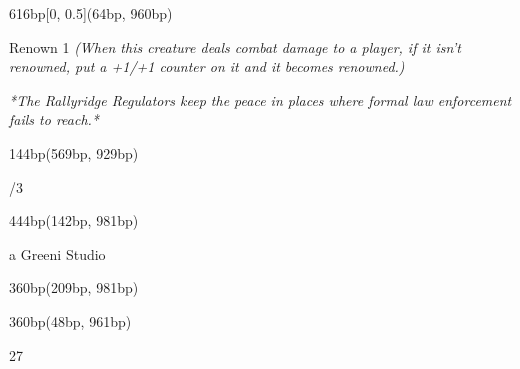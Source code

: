 \documentclass{article}
\begin{document}
  \begin{textblock*}{616bp}[0, 0.5](64bp, 960bp)

  \fontsize{\count255 pt}{\count255 pt}
  \plantin
  \selectfont
	\begin{flushleft}\relax Renown 1 \emph{(When this creature deals combat damage to a player, if it isn't renowned, put a +1/+1 counter on it and it becomes renowned.)}
\relax
  \par{}\par
  \emph{*The Rallyridge Regulators keep the peace in places where formal law enforcement fails to reach.*
}
  \end{flushleft}
  \end{textblock*}
  \begin{textblock*}{144bp}(569bp, 929bp)
  \begin{center}
  \fontsize{39pt}{39pt}
  \beleren
  /3
  \end{center}
  \end{textblock*}
  
  \begin{textblock*}{444bp}(142bp, 981bp)
  \begin{flushleft}
  \fontsize{21pt}{21pt}
  \mana
  \color{offwhite}
  \selectfont
  a
  \belerensmallcaps
  \fontsize{18.5pt}{21pt}
  \selectfont
  \kern-7bp
  Greeni Studio
  \end{flushleft}
  \end{textblock*}

  \begin{textblock*}{360bp}(209bp, 981bp)
  \begin{flushright}
  \fontsize{17pt}{20pt}
  \belerensmallcaps
  \color{offwhite}
  \selectfont
  \strut
  \end{flushright}
  \end{textblock*}
  
  \begin{textblock*}{360bp}(48bp, 961bp)
  \begin{flushleft}
  \fontsize{17pt}{20pt}
  \gotham
  \color{offwhite}
  \selectfont
  27\strut
  \end{flushleft}
  \end{textblock*}
  
\end{document}
